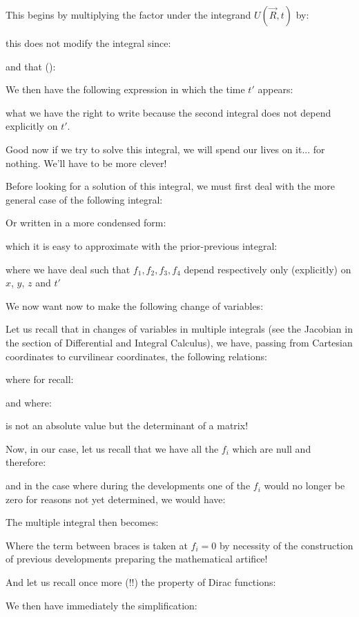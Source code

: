 	This begins by multiplying the factor under the integrand $U(\vec{R},t)$ by:
	
	this does not modify the integral since:
	
	and that ():
	
	We then have the following expression in which the time $t'$ appears:
	
	what we have the right to write because the second integral does not depend explicitly on $t'$.
	
	Good now if we try to solve this integral, we will spend our lives on it... for nothing. We'll have to be more clever!

	Before looking for a solution of this integral, we must first deal with the more general case of the following integral:
	
	Or written in a more condensed form:
	
	which it is easy to approximate with the prior-previous integral:
	
	where we have deal such that $f_1,f_2,f_3,f_4$ depend respectively only (explicitly) on $x$, $y$, $z$ and $t'$ 

	We now want now to make the following change of variables:
	
	Let us recall that in changes of variables in multiple integrals (see the Jacobian in the section of Differential and Integral Calculus), we have, passing from Cartesian coordinates to curvilinear coordinates, the following relations:
	
	where for recall:
	
	and where:
	
	is not an absolute value but the determinant of a matrix!
	
	Now, in our case, let us recall that we have all the $f_i$ which are null and therefore:
	
	and in the case where during the developments one of the $f_i$ would no longer be zero for reasons not yet determined, we would have:
	
	The multiple integral then becomes:
	
	Where the term between braces is taken at $f_i=0$ by necessity of the construction of previous developments preparing the mathematical artifice!

	And let us recall once more (!!) the property of Dirac functions:
	
 	We then have immediately the simplification:
	
